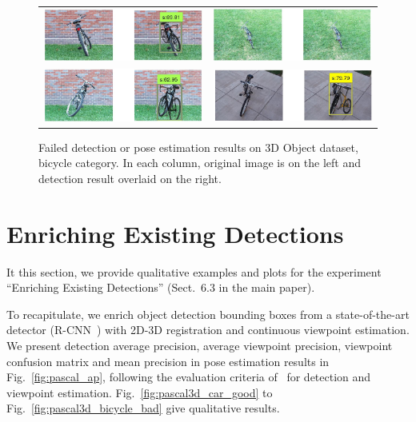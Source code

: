 \documentclass[10pt,twocolumn,letterpaper]{article}
\begin{document}
\begin{figure}[h]
\setlength\tabcolsep{1pt}
\centering
\begin{tabular}{|c|c|}
\hline 
  \includegraphics[width=0.40\linewidth]{supp/bicycle1.png} &
  \includegraphics[width=0.40\linewidth]{supp/bicycle5.png} \\
  \includegraphics[width=0.40\linewidth]{supp/bicycle19.png} &
  \includegraphics[width=0.40\linewidth]{supp/bicycle20.png} \\
\hline
\end{tabular}
\caption{Failed detection or pose estimation results on 3D Object dataset, bicycle
category. In each column, original image is on the left and detection result overlaid on
the right.}%
  \label{fig:3dobject_bicycle_bad}
\end{figure}

\section{Enriching Existing Detections}
%
It this section, we provide qualitative examples and plots for the experiment
``Enriching Existing Detections'' (Sect.~6.3 in the main paper).

To recapitulate, we enrich object detection bounding boxes from
a state-of-the-art detector (R-CNN~\cite{Girshick14}) with 2D-3D
registration and continuous viewpoint estimation. We present detection
average precision, average viewpoint precision, viewpoint confusion
matrix and mean precision in pose estimation results in
Fig.~\ref{fig:pascal_ap}, following the evaluation criteria
of~\cite{Xiang14} for detection and viewpoint
estimation. Fig.~\ref{fig:pascal3d_car_good} to
Fig.~\ref{fig:pascal3d_bicycle_bad} give qualitative results.
%
\end{document}
